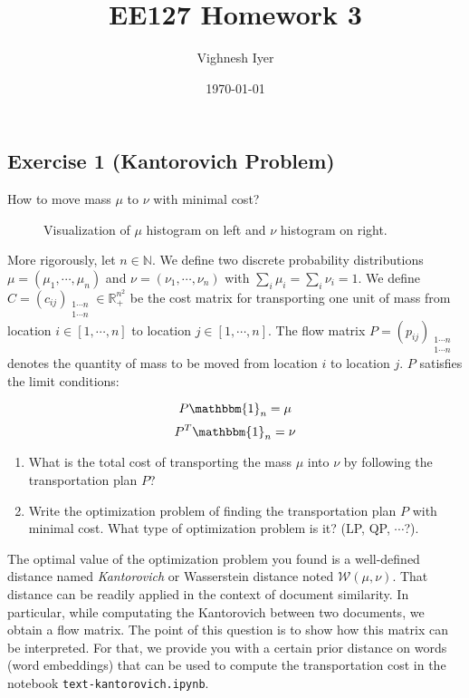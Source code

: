 \documentclass[11pt]{article}
\begin{document}
\title{EE127 Homework 3}
\author{Vighnesh Iyer}
\date{\today}
\maketitle

\subsection*{Exercise 1 (Kantorovich Problem)}

How to move mass $\mu$ to $\nu$ with minimal cost?

\begin{figure}[ht]
\centering
\caption{Visualization of $\mu$ histogram on left and $\nu$ histogram on right.}
\label{fig:histogram}
\end{figure}

More rigorously, let $n \in \mathbb{N}$. We define two discrete probability distributions $\mu = (\mu_1, \cdots, \mu_n)$ and $\nu = (\nu_1, \cdots, \nu_n)$ with $\sum_i \mu_i = \sum_i \nu_i = 1$. We define $C = (c_{ij})_{\substack{{1\cdots n} \\ {1\cdots n}}} \in \mathbb{R}_+^{n^2}$ be the cost matrix for transporting one unit of mass from location $i \in [1, \cdots, n]$ to location $j \in [1, \cdots, n]$. The flow matrix $P = (p_{ij})_{\substack{{1 \cdots n} \\ {1 \cdots n}}}$ denotes the quantity of mass to be moved from location $i$ to location $j$. $P$ satisfies the limit conditions:

\[
P \mathbbm{1}_n = \mu
\]
\[
P^T \mathbbm{1}_n = \nu
\]

\begin{enumerate}

\item What is the total cost of transporting the mass $\mu$ into $\nu$ by following the transportation plan $P$?

\item Write the optimization problem of finding the transportation plan $P$ with minimal cost. What type of optimization problem is it? (LP, QP, $\cdots$?).

\end{enumerate}

The optimal value of the optimization problem you found is a well-defined distance named \emph{Kantorovich} or Wasserstein distance noted $\mathcal{W}(\mu, \nu)$. That distance can be readily applied in the context of document similarity. In particular, while computating the Kantorovich between two documents, we obtain a flow matrix. The point of this question is to show how this matrix can be interpreted. For that, we provide you with a certain prior distance on words (word embeddings) that can be used to compute the transportation cost in the notebook \verb+text-kantorovich.ipynb+. 
\end{document}
